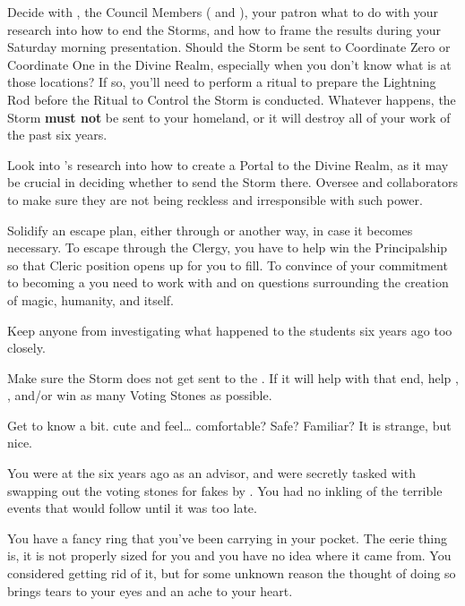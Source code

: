 \documentclass[char]{GL2020}
\begin{document}
\begin{itemz}
    \item Decide with \cAssistantScientist{}, the Council Members (\cAntiChup{} and \cTechStar{}), your patron \cDiplomat{} what to do with your research into how to end the Storms, and how to frame the results during your Saturday morning presentation. Should the Storm be sent to Coordinate Zero or Coordinate One in the Divine Realm, especially when you don’t know what is at those locations? If so, you'll need to perform a ritual to prepare the Lightning Rod before the Ritual to Control the Storm is conducted. Whatever happens, the Storm \textbf{must not} be sent to your homeland, or it will destroy all of your work of the past six years.
    \item Look into \cCurse{}’s research into how to create a Portal to the Divine Realm, as it may be crucial in deciding whether to send the Storm there. Oversee \cCurse{} and \cCurse{\their} collaborators to make sure they are not being reckless and irresponsible with such power.
    \item Solidify an escape plan, either through \cBeetle{} or another way, in case it becomes necessary. To escape through the Clergy, you have to help \cBeetle{} win the Principalship so that \cBeetle{\their} Cleric position opens up for you to fill. To convince \cBeetle{} of your commitment to becoming a \cHeadScientist{\cleric} you need to work with \cEbbPriest{} and \cScholarship{} on questions surrounding the creation of magic, humanity, and \pEarth{} itself.
    \item Keep anyone from investigating what happened to the students six years ago too closely.
    \item Make sure the Storm does not get sent to the \pTech{}. If it will help with that end, help \cTechStar{}, \cHeir{}, and/or \cScholarship{} win as many Voting Stones as possible.
    \item Get to know \cChupAvenger{} a bit. \cChupAvenger{\Theyare} cute and feel\cChupAvenger{\verbs}\ldots{} comfortable? Safe? Familiar? It is strange, but nice.
\end{itemz}

\begin{itemz}[Notes]
    \item You were at the \pSchool{} six years ago as an advisor, and were secretly tasked with swapping out the voting stones for fakes by \cEvil{}. You had no inkling of the terrible events that would follow until it was too late.
    \item You have a fancy ring that you've been carrying in your pocket. The eerie thing is, it is not properly sized for you and you have no idea where it came from. You considered getting rid of it, but for some unknown reason the thought of doing so brings tears to your eyes and an ache to your heart.
\end{itemz}
\end{document}
